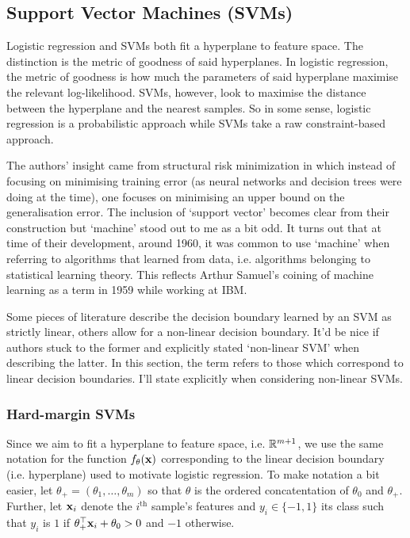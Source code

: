 \documentclass[11pt]{article}
\begin{document}
\subsection{Support Vector Machines (SVMs)}
Logistic regression and SVMs both fit a hyperplane to feature space. The distinction is the metric of goodness of said hyperplanes. In logistic regression, the metric of goodness is how much the parameters of said hyperplane maximise the relevant log-likelihood. SVMs, however, look to maximise the distance between the hyperplane and the nearest samples. So in some sense, logistic regression is a probabilistic approach while SVMs take a raw constraint-based approach.

The authors' insight came from structural risk minimization in which instead of focusing on minimising training error (as neural networks and decision trees were doing at the time), one focuses on minimising an upper bound on the generalisation error. The inclusion of `support vector' becomes clear from their construction but `machine' stood out to me as a bit odd. It turns out that at time of their development, around 1960, it was common to use `machine' when referring to algorithms that learned from data, i.e. algorithms belonging to statistical learning theory. This reflects Arthur Samuel's coining of machine learning as a term in 1959 while working at IBM.

\begin{tcolorbox}[title={\centering\textbf{Inconsistent terminology surrounding SVMs}}, colback=myLightBlue, colbacktitle=myDarkBlue, colframe=myDarkBlue, coltitle=white]
    Some pieces of literature describe the decision boundary learned by an SVM as strictly linear, others allow for a non-linear decision boundary. It'd be nice if authors stuck to the former and explicitly stated `non-linear SVM' when describing the latter. In this section, the term refers to those which correspond to linear decision boundaries. I'll state explicitly when considering non-linear SVMs.
\end{tcolorbox}

\subsubsection{Hard-margin SVMs}
Since we aim to fit a hyperplane to feature space, i.e. $\mathbb{R}^{m+1}$, we use the same notation for the function $f_{\theta}(\mathbf{x})$ corresponding to the linear decision boundary (i.e. hyperplane) used to motivate logistic regression. To make notation a bit easier, let $\theta_+=(\theta_1,\dots,\theta_m)$ so that $\theta$ is the ordered concatentation of $\theta_0$ and $\theta_+$. Further, let $\mathbf{x}_i$ denote the $i^{\text{th}}$ sample's features and $y_i\in\{-1,1\}$ its class such that $y_i$ is $1$ if $\theta_+^\top \mathbf{x}_i+\theta_0>0$ and $-1$ otherwise.
\end{document}
